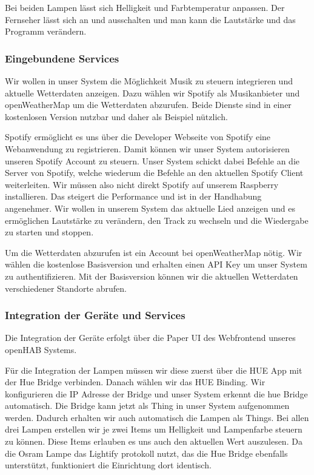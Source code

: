 		Bei beiden Lampen lässt sich Helligkeit und Farbtemperatur anpassen. Der Fernseher lässt sich an und ausschalten und man kann die Lautstärke und das Programm verändern.
		
		\subsubsection{Eingebundene Services}
		Wir wollen in unser System die Möglichkeit Musik zu steuern integrieren und aktuelle Wetterdaten anzeigen. Dazu wählen wir Spotify als Musikanbieter und openWeatherMap um die Wetterdaten abzurufen. Beide Dienste sind in einer kostenlosen Version nutzbar und daher als Beispiel nützlich.
		
		Spotify ermöglicht es uns über die Developer Webseite von Spotify eine Webanwendung zu registrieren. Damit können wir unser System autorisieren unseren Spotify Account zu steuern. Unser System schickt dabei Befehle an die Server von Spotify, welche wiederum die Befehle an den aktuellen Spotify Client weiterleiten. Wir müssen also nicht direkt Spotify auf unserem Raspberry installieren. Das steigert die Performance und ist in der Handhabung angenehmer. Wir wollen in unserem System das aktuelle Lied anzeigen und es ermöglichen Lautstärke zu verändern, den Track zu wechseln und die Wiedergabe zu starten und stoppen.
		
		Um die Wetterdaten abzurufen ist ein Account bei openWeatherMap nötig. Wir wählen die kostenlose Basisversion und erhalten einen API Key um unser System zu authentifizieren. Mit der Basisversion können wir die aktuellen Wetterdaten verschiedener Standorte abrufen.
		
		\subsubsection{Integration der Geräte und Services}
		Die Integration der Geräte erfolgt über die Paper UI des Webfrontend unseres openHAB Systems. 
		
		Für die Integration der Lampen müssen wir diese zuerst über die HUE App mit der Hue Bridge verbinden. Danach wählen wir das HUE Binding. Wir konfigurieren die IP Adresse der Bridge und unser System erkennt die hue Bridge automatisch. Die Bridge kann jetzt als Thing in unser System aufgenommen werden. Dadurch erhalten wir auch automatisch die Lampen als Things. Bei allen drei Lampen erstellen wir je zwei Items um Helligkeit und Lampenfarbe steuern zu können. Diese Items erlauben es uns auch den aktuellen Wert auszulesen. Da die Osram Lampe das Lightify protokoll nutzt, das die Hue Bridge ebenfalls unterstützt, funktioniert die Einrichtung dort identisch.
		
